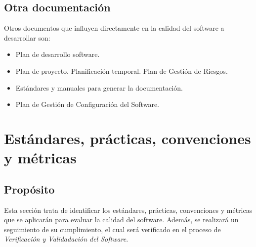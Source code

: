 \documentclass[11pt, a4paper, twoside, titlepage]{article}
\begin{document}
		\subsection{Otra documentación} 
			Otros documentos que influyen directamente en la calidad del software a desarrollar son:

			\begin{itemize}
				\item Plan de desarrollo software.
				\item Plan de proyecto.
					\subitem Planificación temporal.
					\subitem Plan de Gestión de Riesgos.
				\item Estándares y manuales para generar la documentación.
				\item Plan de Gestión de Configuración del Software.
			\end{itemize}
			
	\section{Estándares, prácticas, convenciones y métricas} %
		\subsection{Propósito}
			Esta sección trata de identificar los estándares, prácticas, convenciones y métricas que se aplicarán para evaluar la calidad del software. Además, se realizará un seguimiento de su cumplimiento, el cual será verificado en el proceso de \textit{Verificación y Validadación del Software}.
\end{document}
